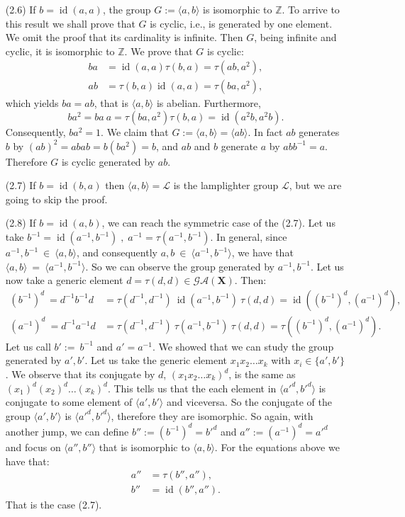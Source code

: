 \documentclass[mat1]{fmfdeloTS2.0}
\newcommand{\Z}{\mathbb Z}
\newcommand{\abece}{\mathbf{X}}			%
\newcommand{\synaut}{\mathcal{GA}}	%
\newcommand{\LL}{\mathcal{L}}		%
\DeclareMathOperator{\id}{\mathrm{id}}			%
\begin{document}
\begin{itemize}
\item[(2.6)] If $b=\id(a,a)$, the group $G:=\langle a,b\rangle $ is isomorphic to $\Z$. To arrive to this result we shall prove that $G$ is cyclic, i.e., is generated by one element. We omit the proof that its cardinality is infinite. Then $G$, being infinite and cyclic, it is isomorphic to $\Z$. We prove that $G$ is cyclic:
\begin{align*}
ba&=\id(a,a)\tau(b,a)=\tau(ab,a^2),\\
ab&=\tau(b,a)\id(a,a)=\tau(ba,a^2),
\end{align*}
which yields $ba=ab$, that is $\langle a,b\rangle $ is abelian. Furthermore,
$$ba^2=ba\:a=\tau(ba,a^2)\tau(b,a)=\id(a^2b,a^2b).$$
Consequently, $ba^2=1$. We claim that $G:=\langle a,b\rangle =\langle ab\rangle $. In fact $ab$ generates $b$ by $(ab)^2=abab=b(ba^2)=b$, and $ab$ and $b$ generate $a$ by $abb^{-1}=a$. Therefore $G$ is cyclic generated by $ab$.

\item[(2.7)] If $b=\id(b,a)$ then $\langle a,b\rangle =\LL$ is the lamplighter group $\LL$, but we are going to skip the proof.

\item[(2.8)] If $b=\id(a,b)$, we can reach the symmetric case of the (2.7). Let us take $b^{-1}=\id(a^{-1},b^{-1})\;,\;a^{-1}=\tau(a^{-1},b^{-1})$. In general, since $a^{-1},b^{-1}\:\in\:\langle a,b\rangle $, and consequently $a,b\:\in\:\langle a^{-1},b^{-1}\rangle $, we have that $\langle a,b\rangle \:=\:\langle a^{-1},b^{-1}\rangle $. So we can observe the group generated by $a^{-1},b^{-1}$. Let us now take a generic element $d=\tau(d,d)\in\synaut(\abece)$. Then:
\begin{align*}\label{eq:case2.8}
(b^{-1})^d\:=d^{-1}b^{-1}d&=\tau(d^{-1},d^{-1})\:\id(a^{-1},b^{-1})\:\tau(d,d)=\id((b^{-1})^d,(a^{-1})^d),\\
(a^{-1})^d\:=d^{-1}a^{-1}d&=\tau(d^{-1},d^{-1})\:\tau(a^{-1},b^{-1})\:\tau(d,d)=\tau((b^{-1})^d,(a^{-1})^d).
\end{align*}
Let us call $b':=\:b^{-1}$ and $a'=a^{-1}$. We showed that we can study the group generated by $a',b'$. Let us take the generic element $x_1x_2\ldots x_k$ with $x_i\in\{a',b'\}$. We observe that its conjugate by $d$, $(x_1x_2\ldots x_k)^d$, is the same as $(x_1)^d(x_2)^d\ldots (x_k)^d$. This tells us that the each element in $\langle a'^d,b'^d\rangle $ is conjugate to some element of $\langle a',b'\rangle $ and viceversa. So the conjugate of the group $\langle a',b'\rangle $ is $\langle a'^d,b'^d\rangle $, therefore they are isomorphic.
So again, with another jump, we can define $b'':=(b^{-1})^d=b'^d$ and $a'':=(a^{-1})^d=a'^d$ and focus on $\langle a'',b''\rangle $ that is isomorphic to $\langle a,b\rangle $. For the equations above we have that:
\begin{align*}
a''&=\tau(b'',a''),\\
b''&=\id(b'',a'').
\end{align*}
That is the case (2.7).
\end{itemize}
\end{document}
